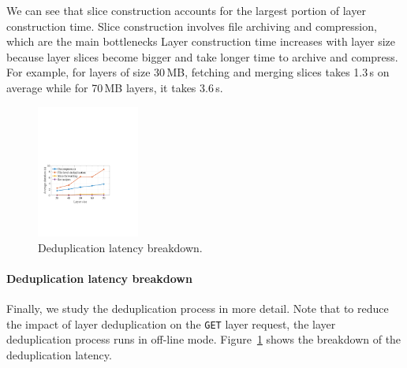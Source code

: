 We can see that slice construction accounts for the largest portion of layer construction time.
%
Slice construction involves file archiving and compression, which are the main bottlenecks
Layer construction time increases with layer size because layer slices become bigger and
take longer time to archive and compress.
%
For example, for layers of size 30\,MB, fetching and merging slices takes 1.3\,s on average while
for 70\,MB layers, it takes 3.6\,s.

\begin{figure}[t]
	\centering
	\includegraphics[width=0.3\textwidth]{graphs/dedupbreakdown.pdf}
	\caption{Deduplication latency breakdown.}
	\label{fig:eval-dedupbreakdown}
\end{figure}

\paragraph{Deduplication latency breakdown}
%
Finally, we study the deduplication process in more detail.
%
Note that to reduce the impact of layer deduplication on the \texttt{GET} layer request,
the layer deduplication process runs in off-line mode.
%
Figure~\ref{fig:eval-dedupbreakdown} shows the breakdown of the deduplication latency.


